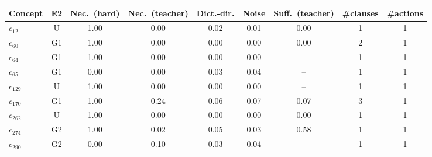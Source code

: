 \begin{tabular}{lcccccccc}
\toprule
Concept & E2 & Nec.\ (hard) & Nec.\ (teacher) & Dict.-dir. & Noise & Suff.\ (teacher) & \#clauses & \#actions \\
\midrule
$c_{12}$ & U & 1.00 & 0.00 & 0.02 & 0.01 & 0.00 & 1 & 1 \\
$c_{60}$ & G1 & 1.00 & 0.00 & 0.00 & 0.00 & 0.00 & 2 & 1 \\
$c_{64}$ & G1 & 1.00 & 0.00 & 0.00 & 0.00 & -- & 1 & 1 \\
$c_{65}$ & G1 & 0.00 & 0.00 & 0.03 & 0.04 & -- & 1 & 1 \\
$c_{129}$ & U & 1.00 & 0.00 & 0.00 & 0.00 & -- & 1 & 1 \\
$c_{170}$ & G1 & 1.00 & 0.24 & 0.06 & 0.07 & 0.07 & 3 & 1 \\
$c_{262}$ & U & 1.00 & 0.00 & 0.00 & 0.00 & 0.00 & 1 & 1 \\
$c_{274}$ & G2 & 1.00 & 0.02 & 0.05 & 0.03 & 0.58 & 1 & 1 \\
$c_{290}$ & G2 & 0.00 & 0.10 & 0.03 & 0.04 & -- & 1 & 1 \\
\bottomrule
\end{tabular}
